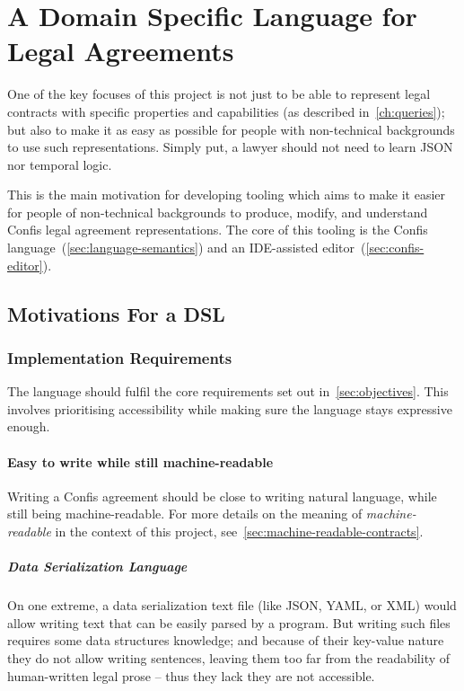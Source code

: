 \chapter{A Domain Specific Language for Legal Agreements}\label{ch:lang}

One of the key focuses of this project is not just to be able to represent legal contracts with specific properties and capabilities (as described in~\autoref{ch:queries});
but also to make it as easy as possible for people with non-technical backgrounds to use such representations.
Simply put, a lawyer should not need to learn JSON nor temporal logic.

This is the main motivation for developing tooling which aims to make it easier for people of non-technical backgrounds to produce, modify, and understand Confis legal agreement representations.
The core of this tooling is the Confis language~(\autoref{sec:language-semantics}) and an IDE-assisted editor~(\autoref{sec:confis-editor}).


\section{Motivations For a DSL}\label{sec:dsl-motivations}

\subsection{Implementation Requirements}\label{subsec:dsl:requirements}

The language should fulfil the core requirements set out in~\autoref{sec:objectives}.
This involves prioritising accessibility while making sure the language stays expressive enough.

\subsubsection{Easy to write while still machine-readable}

Writing a Confis agreement should be close to writing natural language, while still being machine-readable.
For more details on the meaning of \emph{machine-readable} in the context of this project, see~\autoref{sec:machine-readable-contracts}.

\paragraph{Data Serialization Language}

On one extreme, a data serialization text file (like JSON, YAML, or XML) would allow writing text that can be easily parsed by a program.
But writing such files requires some data structures knowledge;
and because of their key-value nature they do not allow writing sentences, leaving them too far from the readability of human-written legal prose -- thus they lack they are not accessible.


